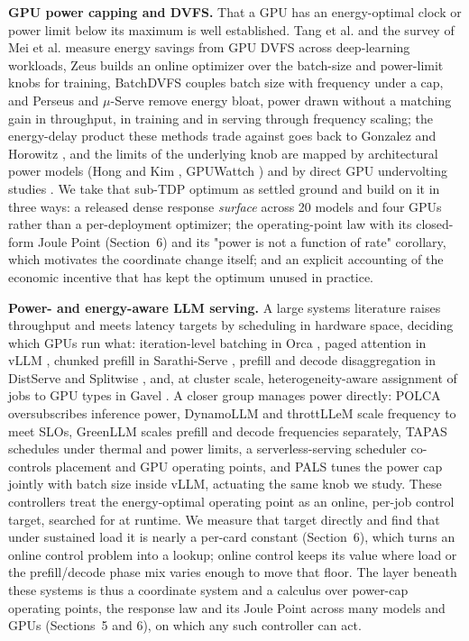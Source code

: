 \textbf{GPU power capping and DVFS.} That a GPU has an energy-optimal clock or power limit below its maximum
is well established. Tang et al. \cite{ref17} and the survey of Mei et al. \cite{ref18} measure energy savings from GPU DVFS
across deep-learning workloads, Zeus \cite{ref2} builds an online optimizer over the batch-size and power-limit knobs
for training, BatchDVFS \cite{ref21} couples batch size with frequency under a cap, and Perseus \cite{ref20} and
$\mu$-Serve \cite{ref22} remove energy bloat, power drawn without a matching gain in throughput, in training and in serving through frequency scaling; the energy-delay
product these methods trade against goes back to Gonzalez and Horowitz \cite{ref19}, and the limits of the underlying
knob are mapped by architectural power models (Hong and Kim \cite{ref38}, GPUWattch \cite{ref39}) and by direct GPU undervolting
studies \cite{ref40}. We take that sub-TDP optimum as settled ground and build on it in three ways: a released dense response \emph{surface} across 20
models and four GPUs rather than a per-deployment optimizer; the operating-point law with its closed-form Joule Point (Section~6) and its "power is not a function of rate" corollary, which motivates the coordinate
change itself; and an explicit accounting of the economic incentive that has kept the optimum unused in
practice.

\textbf{Power- and energy-aware LLM serving.} A large systems literature raises throughput and meets
latency targets by scheduling in hardware space, deciding which GPUs run what: iteration-level batching in Orca \cite{ref23}, paged attention in
vLLM \cite{ref24}, chunked prefill in Sarathi-Serve \cite{ref25}, prefill and decode disaggregation in DistServe \cite{ref26} and
Splitwise \cite{ref16}, and, at cluster scale, heterogeneity-aware assignment of jobs to GPU types in Gavel \cite{ref27}. A closer group manages power directly: POLCA
\cite{ref3} oversubscribes inference power, DynamoLLM \cite{ref4} and throttLL\textquotesingle eM \cite{ref45} scale frequency to meet SLOs, GreenLLM
\cite{ref46} scales prefill and decode frequencies separately, TAPAS \cite{ref47} schedules under thermal and power limits,
a serverless-serving scheduler \cite{ref44} co-controls placement and GPU operating points, and PALS \cite{ref43} tunes the
power cap jointly with batch size inside vLLM, actuating the same knob we study. These controllers treat the
energy-optimal operating point as an online, per-job control target, searched for at runtime. We measure that
target directly and find that under sustained load it is nearly a per-card constant (Section~6), which
turns an online control problem into a lookup; online control keeps
its value where load or the prefill/decode phase mix varies enough to move that floor. The layer beneath these
systems is thus a coordinate system and a calculus over power-cap operating points, the response law and its
Joule Point across many models and GPUs (Sections~5 and 6), on which any such controller can act.

